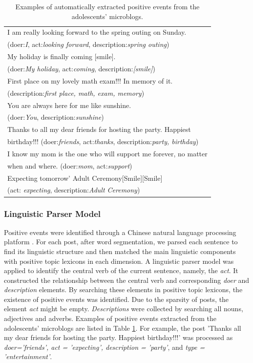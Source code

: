 \begin{table}[h]
\begin{center}
\caption{\small{Examples of automatically extracted positive events from the adolescents' microblogs.}}
\small{
\begin{tabular}{|l|} \hline
I am really looking forward to the spring outing on Sunday. \\
(doer:\emph{I}, act:\emph{looking forward}, description:\emph{spring outing})\\\hline
My holiday is finally coming [smile]. \\
(doer:\emph{My holiday}, act:\emph{coming}, description:\emph{[smile]})\\\hline
First place on my lovely math exam!!! In memory of it.\\
(description:\emph{first place, math, exam, memory})\\\hline
You are always here for me like sunshine. \\
(doer:\emph{You}, description:\emph{sunshine})\\\hline
Thanks to all my dear friends for hosting the party. Happiest\\
birthday!!! (doer:\emph{friends}, act:\emph{thanks}, description:\emph{party, birthday})\\\hline
I know my mom is the one who will support me forever, no matter \\
when and where. (doer:\emph{mom}, act:\emph{support})\\ \hline
Expecting tomorrow' Adult Ceremony[Smile][Smile]~~\\
(act: \emph{expecting}, description:\emph{Adult Ceremony})\\\hline
\end{tabular}}
\label{tab:uplifts}
\end{center}
\end{table}

\subsubsection{Linguistic Parser Model}
Positive events were identified through a Chinese natural language processing platform \citep{Che2010}.
For each post, after word segmentation, we parsed each sentence to find its linguistic structure
and then matched the main linguistic components with positive topic lexicons in each dimension.
A linguistic parser model was applied to identify the central verb of the current sentence, namely, the \emph{act}.
It constructed the relationship between the central verb and corresponding \emph{doer} and \emph{description} elements.
By searching these elements in positive topic lexicons,
the existence of positive events was identified.
Due to the sparsity of posts, the element \emph{act} might be empty.
\emph{Descriptions} were collected by searching all nouns, adjectives and adverbs.
Examples of positive events extracted from the adolescents' microblogs are listed in Table \ref{tab:uplifts}.
For example, the post 'Thanks all my dear friends for hosting the party. Happiest birthday!!!'
was processed as \emph{doer='friends', act = 'expecting', description = 'party'},
and \emph{type = 'entertainment'}.

